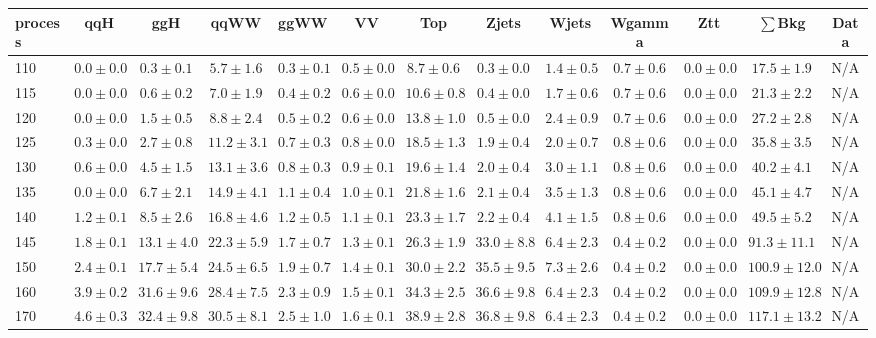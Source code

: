 \begin{table}
{%
 \tiny
 \begin{center}
 \begin{tabular}{l | c c | c c c c c c c c  | c c}
 \hline
 process & qqH & ggH & qqWW & ggWW & VV & Top & Zjets & Wjets & Wgamma & Ztt & $\sum$Bkg & Data \\
 \hline
110 & $0.0\pm0.0$ & $0.3\pm0.1$ & $5.7\pm1.6$ & $0.3\pm0.1$ & $0.5\pm0.0$ & $8.7\pm0.6$ & $0.3\pm0.0$ & $1.4\pm0.5$ & $0.7\pm0.6$ & $0.0\pm0.0$ & $17.5\pm1.9$ & N/A \\
115 & $0.0\pm0.0$ & $0.6\pm0.2$ & $7.0\pm1.9$ & $0.4\pm0.2$ & $0.6\pm0.0$ & $10.6\pm0.8$ & $0.4\pm0.0$ & $1.7\pm0.6$ & $0.7\pm0.6$ & $0.0\pm0.0$ & $21.3\pm2.2$ & N/A \\
120 & $0.0\pm0.0$ & $1.5\pm0.5$ & $8.8\pm2.4$ & $0.5\pm0.2$ & $0.6\pm0.0$ & $13.8\pm1.0$ & $0.5\pm0.0$ & $2.4\pm0.9$ & $0.7\pm0.6$ & $0.0\pm0.0$ & $27.2\pm2.8$ & N/A \\
125 & $0.3\pm0.0$ & $2.7\pm0.8$ & $11.2\pm3.1$ & $0.7\pm0.3$ & $0.8\pm0.0$ & $18.5\pm1.3$ & $1.9\pm0.4$ & $2.0\pm0.7$ & $0.8\pm0.6$ & $0.0\pm0.0$ & $35.8\pm3.5$ & N/A \\
130 & $0.6\pm0.0$ & $4.5\pm1.5$ & $13.1\pm3.6$ & $0.8\pm0.3$ & $0.9\pm0.1$ & $19.6\pm1.4$ & $2.0\pm0.4$ & $3.0\pm1.1$ & $0.8\pm0.6$ & $0.0\pm0.0$ & $40.2\pm4.1$ & N/A \\
135 & $0.0\pm0.0$ & $6.7\pm2.1$ & $14.9\pm4.1$ & $1.1\pm0.4$ & $1.0\pm0.1$ & $21.8\pm1.6$ & $2.1\pm0.4$ & $3.5\pm1.3$ & $0.8\pm0.6$ & $0.0\pm0.0$ & $45.1\pm4.7$ & N/A \\
140 & $1.2\pm0.1$ & $8.5\pm2.6$ & $16.8\pm4.6$ & $1.2\pm0.5$ & $1.1\pm0.1$ & $23.3\pm1.7$ & $2.2\pm0.4$ & $4.1\pm1.5$ & $0.8\pm0.6$ & $0.0\pm0.0$ & $49.5\pm5.2$ & N/A \\
145 & $1.8\pm0.1$ & $13.1\pm4.0$ & $22.3\pm5.9$ & $1.7\pm0.7$ & $1.3\pm0.1$ & $26.3\pm1.9$ & $33.0\pm8.8$ & $6.4\pm2.3$ & $0.4\pm0.2$ & $0.0\pm0.0$ & $91.3\pm11.1$ & N/A \\
150 & $2.4\pm0.1$ & $17.7\pm5.4$ & $24.5\pm6.5$ & $1.9\pm0.7$ & $1.4\pm0.1$ & $30.0\pm2.2$ & $35.5\pm9.5$ & $7.3\pm2.6$ & $0.4\pm0.2$ & $0.0\pm0.0$ & $100.9\pm12.0$ & N/A \\
160 & $3.9\pm0.2$ & $31.6\pm9.6$ & $28.4\pm7.5$ & $2.3\pm0.9$ & $1.5\pm0.1$ & $34.3\pm2.5$ & $36.6\pm9.8$ & $6.4\pm2.3$ & $0.4\pm0.2$ & $0.0\pm0.0$ & $109.9\pm12.8$ & N/A \\
170 & $4.6\pm0.3$ & $32.4\pm9.8$ & $30.5\pm8.1$ & $2.5\pm1.0$ & $1.6\pm0.1$ & $38.9\pm2.8$ & $36.8\pm9.8$ & $6.4\pm2.3$ & $0.4\pm0.2$ & $0.0\pm0.0$ & $117.1\pm13.2$ & N/A \\

\end{tabular}
\end{center}}
\end{table}
